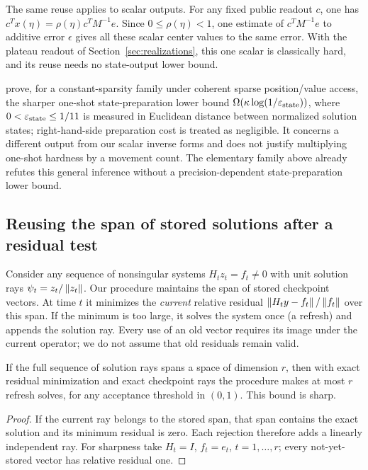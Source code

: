 The same reuse applies to scalar outputs.  For any fixed public
readout $c$, one has $c^Tx(\eta)=\rho(\eta)c^TM^{-1}e$.
Since $0\leq\rho(\eta)<1$, one estimate of $c^TM^{-1}e$ to additive error
$\epsilon$ gives all these scalar center values to the same error.  With the plateau readout of Section~\ref{sec:realizations},
this one scalar is classically hard, and its reuse needs no state-output
lower bound.

\citet[Theorem~1]{MoriEtAl2026} prove, for a constant-sparsity family
under coherent sparse position/value access, the sharper one-shot
state-preparation lower bound
$\Omega(\kappa\log(1/\varepsilon_{\rm state}))$, where
$0<\varepsilon_{\rm state}\leq1/11$ is measured in Euclidean distance
between normalized solution states; right-hand-side preparation cost is
treated as negligible.  It concerns a different output from our
scalar inverse forms and does not justify multiplying one-shot hardness
by a movement count.  The elementary family above already refutes this
general inference without a precision-dependent state-preparation lower
bound.

\subsection{Reusing the span of stored solutions after a residual test}
Consider any sequence of nonsingular systems $H_tz_t=f_t\ne0$ with unit
solution rays $\psi_t=z_t/\left\lVert z_t\right\rVert$.  Our procedure maintains the span
of stored checkpoint vectors.  At time $t$ it minimizes the
\emph{current} relative residual $\left\lVert H_ty-f_t\right\rVert/\left\lVert f_t\right\rVert$ over this
span.  If the minimum is too large, it solves the system once (a refresh)
and appends the solution ray.  Every use of an old vector requires its
image under the current operator; we do not assume that old residuals
remain valid.

\begin{proposition}\label{prop:exact-reuse}
If the full sequence of solution rays spans a space of dimension $r$, then
with exact residual minimization and exact checkpoint rays the procedure
makes at most $r$ refresh solves, for any acceptance threshold in $(0,1)$.
This bound is sharp.
\end{proposition}
\begin{proof}
If the current ray belongs to the stored span, that span contains the exact
solution and its minimum residual is zero.  Each rejection therefore adds
a linearly independent ray.  For sharpness take $H_t=I$, $f_t=e_t$,
$t=1,\ldots,r$; every not-yet-stored vector has relative residual one.
\end{proof}

